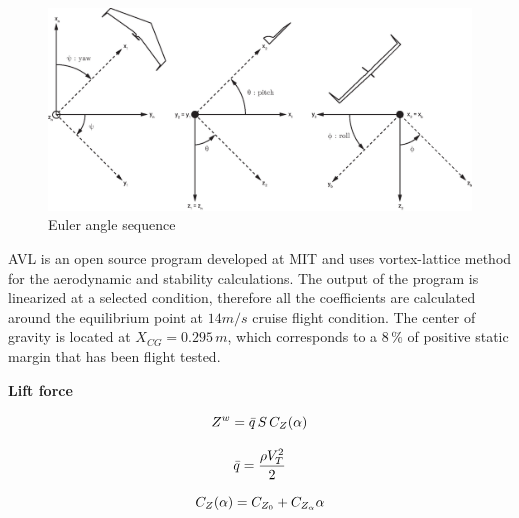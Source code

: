 \begin{landscape}
\begin{figure}
\begin{center}
\includegraphics[width=23cm]{figures/ZagiEulerAngleSequence}
\caption{Euler angle sequence \cite{ducard2009fault}} 
\label{fig:eulerAngSequence}
\end{center}
\end{figure}
\end{landscape}


AVL is an open source program developed at MIT and uses vortex-lattice method for the aerodynamic and stability calculations.
The output of the program is linearized at a selected condition, therefore all the coefficients are calculated around the equilibrium point at $14m/s$ cruise flight condition.
The center of gravity is located at $X_{CG}= 0.295\,m$, which corresponds to a $8\,\%$ of positive static margin that has been flight tested. %





\textbf{Lift force}

\begin{equation}{\label{eqn:liftForce}}
Z^w = \bar{q} \, S \,  C_Z(\alpha)
\end{equation}

\begin{equation}{\label{eqn:dynamicPressure}}
\bar{q} = \frac{\rho V_T^2}{2} 
\end{equation}

\begin{equation}{\label{eqn:liftCoef}}
C_Z(\alpha) = C_{Z_0} + C_{Z_{\alpha}} \alpha 
\end{equation}


